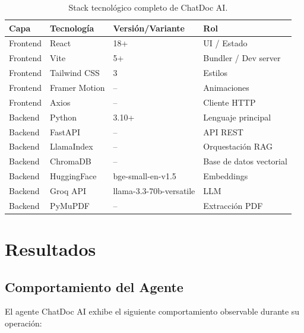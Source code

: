 \documentclass[12pt,a4paper]{article}
\begin{document}
\begin{table}[H]
\centering
\renewcommand{\arraystretch}{1.3}
\begin{tabular}{llll}
\toprule
\textbf{Capa} & \textbf{Tecnología} & \textbf{Versión/Variante} & \textbf{Rol} \\
\midrule
Frontend & React & 18+ & UI / Estado \\
Frontend & Vite & 5+ & Bundler / Dev server \\
Frontend & Tailwind CSS & 3 & Estilos \\
Frontend & Framer Motion & -- & Animaciones \\
Frontend & Axios & -- & Cliente HTTP \\
Backend & Python & 3.10+ & Lenguaje principal \\
Backend & FastAPI & -- & API REST \\
Backend & LlamaIndex & -- & Orquestación RAG \\
Backend & ChromaDB & -- & Base de datos vectorial \\
Backend & HuggingFace & bge-small-en-v1.5 & Embeddings \\
Backend & Groq API & llama-3.3-70b-versatile & LLM \\
Backend & PyMuPDF & -- & Extracción PDF \\
\bottomrule
\end{tabular}
\caption{Stack tecnológico completo de ChatDoc AI.}
\label{tab:stack}
\end{table}

\section{Resultados}

\subsection{Comportamiento del Agente}

El agente ChatDoc AI exhibe el siguiente comportamiento observable durante su operación:
\end{document}
